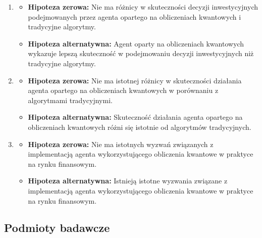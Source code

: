 \documentclass[polish,envcountsect,10pt]{article}
\begin{document}
\begin{enumerate}
    \item 
        \begin{itemize}
			\item \textbf{Hipoteza zerowa:} Nie ma różnicy w skuteczności decyzji inwestycyjnych podejmowanych przez agenta opartego na obliczeniach kwantowych i tradycyjne algorytmy.
			\item \textbf{Hipoteza alternatywna:} Agent oparty na obliczeniach kwantowych wykazuje lepszą skuteczność w podejmowaniu decyzji inwestycyjnych niż tradycyjne algorytmy.
        \end{itemize}
        
    \item 
        \begin{itemize}
			\item \textbf{Hipoteza zerowa:} Nie ma istotnej różnicy w skuteczności działania agenta opartego na obliczeniach kwantowych w porównaniu z algorytmami tradycyjnymi.
			\item \textbf{Hipoteza alternatywna:} Skuteczność działania agenta opartego na obliczeniach kwantowych różni się istotnie od algorytmów tradycyjnych.
        \end{itemize}
        
    \item 
        \begin{itemize}
			\item \textbf{Hipoteza zerowa:} Nie ma istotnych wyzwań związanych z implementacją agenta wykorzystującego obliczenia kwantowe w praktyce na rynku finansowym.
			\item \textbf{Hipoteza alternatywna:} Istnieją istotne wyzwania związane z implementacją agenta wykorzystującego obliczenia kwantowe w praktyce na rynku finansowym.
        \end{itemize}
\end{enumerate}

\subsection{Podmioty badawcze} 
\end{document}
